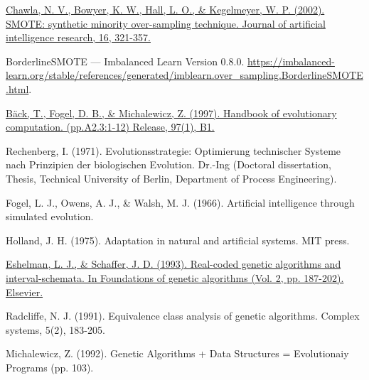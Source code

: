 \begin{thebibliography}{9}

	\href{https://www.jair.org/index.php/jair/article/view/10302}{Chawla, N. V., Bowyer, K. W., Hall, L. O., \& Kegelmeyer, W. P. (2002). SMOTE: synthetic minority over-sampling technique. Journal of artificial intelligence research, 16, 321-357.}


	BorderlineSMOTE — Imbalanced Learn Version 0.8.0. \url{https://imbalanced-learn.org/stable/references/generated/imblearn.over_sampling.BorderlineSMOTE.html}.



	\href{https://www.researchgate.net/publication/216300863_A_history_of_evolutionary_computation}{Bäck, T., Fogel, D. B., \& Michalewicz, Z. (1997). Handbook of evolutionary computation. (pp.A2.3:1-12) Release, 97(1), B1.}


	Rechenberg, I. (1971). Evolutionsstrategie: Optimierung technischer Systeme nach Prinzipien der biologischen Evolution. Dr.-Ing (Doctoral dissertation, Thesis, Technical University of Berlin, Department of Process Engineering).


	Fogel, L. J., Owens, A. J., \& Walsh, M. J. (1966). Artificial intelligence through simulated evolution.


	Holland, J. H. (1975). Adaptation in natural and artificial systems. MIT press.


	\href{https://www.sciencedirect.com/science/article/pii/B9780080948324500180}{Eshelman, L. J., \& Schaffer, J. D. (1993). Real-coded genetic algorithms and interval-schemata. In Foundations of genetic algorithms (Vol. 2, pp. 187-202). Elsevier.}


	Radcliffe, N. J. (1991). Equivalence class analysis of genetic algorithms. Complex systems, 5(2), 183-205.


	Michalewicz, Z. (1992). Genetic Algorithms + Data Structures = Evolutionaiy Programs (pp. 103).



\end{thebibliography}
